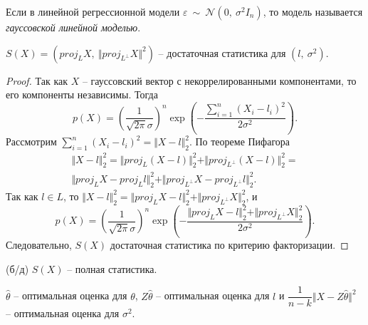 \begin{definition}
    Если в линейной регрессионной модели $\displaystyle \varepsilon \ \sim \ \mathcal{N}\left( 0,\ \sigma ^{2} I_{n}\right)$, то модель называется \textit{гауссовской линейной моделью}.
\end{definition}
\begin{proposition}
    $\displaystyle S( X) =\left( proj_{L} X,\ \Vert proj_{L^{\perp }} X\Vert ^{2}\right)$ -- достаточная статистика для $\displaystyle \left( l,\ \sigma ^{2}\right)$.
\end{proposition}
\begin{proof}
    Так как $\displaystyle X$ -- гауссовский вектор с некоррелированными компонентами, то его компоненты независимы. Тогда
    \begin{equation*}
        p( X) =\left(\dfrac{1}{\sqrt{2\pi } \sigma }\right)^{n}\exp\left( -\dfrac{\sum _{i=1}^{n}( X_{i} -l_{i})^{2}}{2\sigma ^{2}}\right) .
    \end{equation*}
    Рассмотрим $\displaystyle \sum _{i=1}^{n}( X_{i} -l_{i})^{2} =\Vert X-l\Vert _{2}^{2}$. По теореме Пифагора
    \begin{gather*}
        \Vert X-l\Vert _{2}^{2} =\Vert proj_{L}( X-l)\Vert _{2}^{2} +\Vert proj_{L^{\perp }}( X-l)\Vert _{2}^{2} =\\
        \Vert proj_{L} X-proj_{L} l\Vert _{2}^{2} +\Vert proj_{L^{\perp }} X-proj_{L^{\perp }} l\Vert _{2}^{2} .
    \end{gather*}
    Так как $\displaystyle l\in L$, то $\displaystyle \Vert X-l\Vert _{2}^{2} =\Vert proj_{L} X-l\Vert _{2}^{2} +\Vert proj_{L^{\perp }} X\Vert _{2}^{2}$, и
    \begin{equation*}
        p( X) =\left(\dfrac{1}{\sqrt{2\pi } \sigma }\right)^{n}\exp\left( -\dfrac{\Vert proj_{L} X-l\Vert _{2}^{2} +\Vert proj_{L^{\perp }} X\Vert _{2}^{2}}{2\sigma ^{2}}\right) .
    \end{equation*}
    Следовательно, $\displaystyle S( X)$ достаточная статистика по критерию факторизации.
\end{proof}
\begin{theorem}
    (б/д) $\displaystyle S( X)$ -- полная статистика.
\end{theorem}
\begin{corollary}
    $\displaystyle \hat{\theta }$ -- оптимальная оценка для $\displaystyle \theta $, $\displaystyle Z\hat{\theta }$ -- оптимальная оценка для $\displaystyle l$ и $\displaystyle \dfrac{1}{n-k}\Vert X-Z\hat{\theta }\Vert ^{2}$ -- оптимальная оценка для $\displaystyle \sigma ^{2}$.
\end{corollary}
